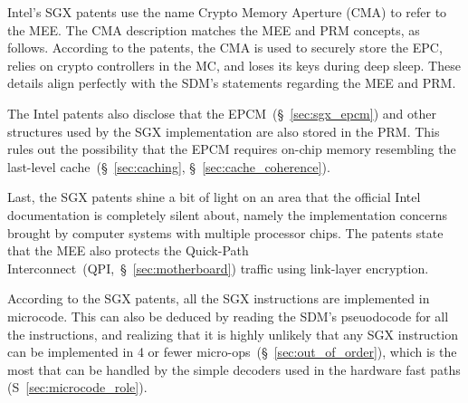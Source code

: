 

Intel's SGX patents use the name Crypto Memory Aperture (CMA) to refer to the
MEE. The CMA description matches the MEE and PRM concepts, as follows.
According to the patents, the CMA is used to securely store the EPC, relies on
crypto controllers in the MC, and loses its keys during deep sleep. These
details align perfectly with the SDM's statements regarding the MEE and PRM.


The Intel patents also disclose that the EPCM~(\S~\ref{sec:sgx_epcm}) and
other structures used by the SGX implementation are also stored in the PRM.
This rules out the possibility that the EPCM requires on-chip memory resembling
the last-level cache~(\S~\ref{sec:caching}, \S~\ref{sec:cache_coherence}).

Last, the SGX patents shine a bit of light on an area that the official Intel
documentation is completely silent about, namely the implementation concerns
brought by computer systems with multiple processor chips. The patents state
that the MEE also protects the
Quick-Path Interconnect~(QPI,~\S~\ref{sec:motherboard}) traffic using
link-layer encryption.


\label{sec:sgx_microcode_modifications}


According to the SGX patents, all the SGX instructions are implemented in
microcode. This can also be deduced by reading the SDM's pseuodocode for all
the instructions, and realizing that it is highly unlikely that any SGX
instruction can be implemented in 4 or fewer
micro-ops~(\S~\ref{sec:out_of_order}), which is the most that can be
handled by the simple decoders used in the hardware fast paths
(S~\ref{sec:microcode_role}).


